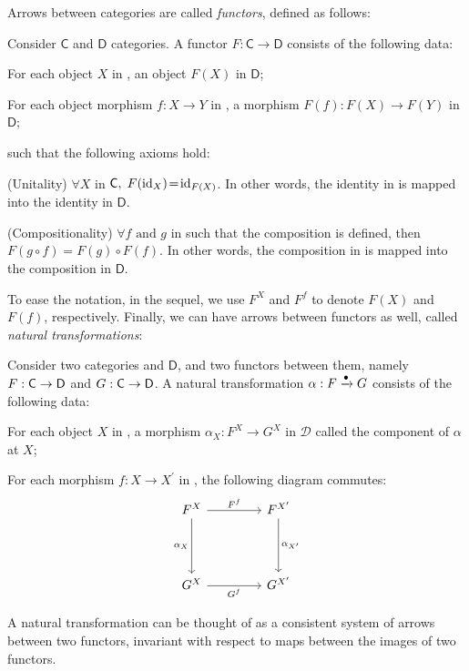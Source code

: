 Arrows between categories are called \emph{functors}, defined as follows:

\begin{definition}[Functor]\label{def:functor}
    Consider $\mathsf{C}$ and $\mathsf{D}$ categories. 
    A functor $F: \mathsf{C} \rightarrow \mathsf{D}$ consists of the following data:
    \begin{squishlist}
        \item For each object $X$ in \Ccat, an object $F(X)$ in $\mathsf{D}$;
        \item For each object morphism $f: X \rightarrow Y$ in \Ccat, a morphism $F(f): F(X) \rightarrow F(Y)$ in $\mathsf{D}$;
    \end{squishlist}
    such that the following axioms hold:
    \begin{squishlist}
        \item (Unitality) $\forall X $ in $ \mathsf{C}, \; F(\mathrm{id}_X) \!=\! \mathrm{id}_{F(X)}$. In other words, the identity in \Ccat is mapped into the identity in $\mathsf{D}$.
        \item (Compositionality) $\forall f \text{ and } g $ in \Ccat such that the composition is defined, then $F(g \circ f) = F(g) \circ F(f)$. In other words, the composition in \Ccat is mapped into the composition in $\mathsf{D}$.
    \end{squishlist}
\end{definition}

To ease the notation, in the sequel, we use $F^X$ and $F^f$ to denote $F(X)$ and $F(f)$, respectively.
Finally, we can have arrows between functors as well, called \emph{natural transformations}:

\begin{definition}\label{def:nat_transf}
Consider two categories \Ccat and $\mathsf{D}$, and two functors between them, namely $F: \mathsf{C} \rightarrow \mathsf{D}$ and $G: \mathsf{C} \rightarrow \mathsf{D}$.
A natural transformation $\alpha: F \xrightarrow{\bullet} G$ consists of the following data:
\begin{squishlist}
    \item For each object $X $ in \Ccat, a morphism $\alpha_{X}: F^X \rightarrow G^X$ in $\mathcal{D}$ called the component of $\alpha$ at $X$;
    \item For each morphism $f: X \rightarrow X^\prime$ in \Ccat, the following diagram commutes:
    \begin{equation}
        \begin{tikzcd}[row sep=1.5cm, column sep=1.5cm]
            F^X \arrow[r, "F^f"] \arrow[d, "\alpha_X"'] & F^{X^\prime} \arrow[d, "\alpha_{X^\prime}"] \\
            G^X \arrow[r, "G^f"'] & G^{X^\prime}
        \end{tikzcd}
    \end{equation}
\end{squishlist}
\end{definition}

A natural transformation can be thought of as a consistent system of arrows between two functors, invariant with respect to maps between the images of two functors.